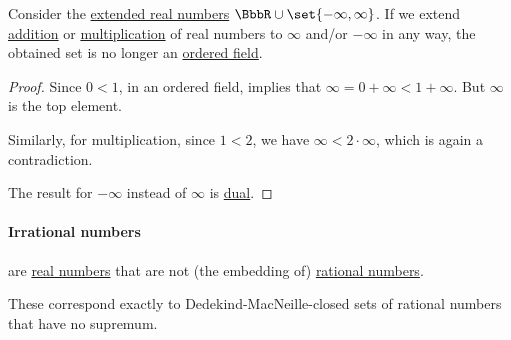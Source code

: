 \begin{proposition}\label{thm:extended_real_numbers_are_not_field}
  Consider the \hyperref[def:extended_real_numbers]{extended real numbers} \( \BbbR \cup \set{ -\infty, \infty } \). If we extend \hyperref[def:real_number_arithmetic/addition]{addition} or \hyperref[def:real_number_arithmetic/multiplication]{multiplication} of real numbers to \( \infty \) and/or \( -\infty \) in any way, the obtained set is no longer an \hyperref[def:ordered_semiring]{ordered field}.
\end{proposition}
\begin{proof}
  Since \( 0 < 1 \), in an ordered field,  implies that \( \infty = 0 + \infty < 1 + \infty \). But \( \infty \) is the top element.

  Similarly, for multiplication, since \( 1 < 2 \), we have \( \infty < 2 \cdot \infty \), which is again a contradiction.

  The result for \( -\infty \) instead of \( \infty \) is \hyperref[def:semilattice/duality]{dual}.
\end{proof}

\paragraph{Irrational numbers}

\begin{definition}\label{def:irrational_numbers}\mimprovised
   are \hyperref[def:real_numbers]{real numbers} that are not (the embedding of) \hyperref[def:rational_numbers]{rational numbers}.
\end{definition}
\begin{comments}
  \item These correspond exactly to Dedekind-MacNeille-closed sets of rational numbers that have no supremum.
\end{comments}

